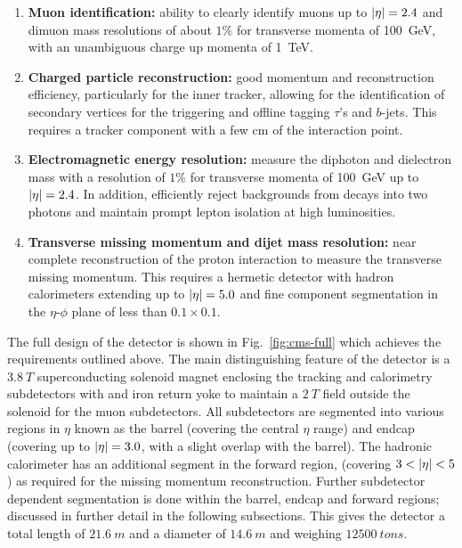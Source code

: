 \begin{enumerate}
    \item \textbf{Muon identification:} ability to clearly identify muons up to
    $|\eta|=2.4$ and dimuon mass resolutions of about $1\%$ for transverse
    momenta of \SI{100}{GeV}, with an unambiguous charge up momenta of
    \SI{1}{TeV}.
    \item \textbf{Charged particle reconstruction:} good momentum and
    reconstruction efficiency, particularly for the inner tracker, allowing
    for the identification of secondary vertices for the triggering and
    offline tagging $\tau$'s and $b$-jets. This requires a tracker component
    with a few cm of the interaction point.
    \item \textbf{Electromagnetic energy resolution:} measure the diphoton and
    dielectron mass with a resolution of $1\%$ for transverse momenta of
    \SI{100}{GeV} up to $|\eta|=2.4$. In addition, efficiently reject backgrounds
    from \Ppizero decays into two photons and maintain prompt lepton isolation
    at high luminosities.
    \item \textbf{Transverse missing momentum and dijet mass resolution:} near
    complete reconstruction of the proton interaction to measure the
    transverse missing momentum. This requires a hermetic detector with hadron
    calorimeters extending up to $|\eta|=5.0$ and fine component segmentation
    in the $\eta$-$\phi$ plane of less than $0.1\times 0.1$.
\end{enumerate}

The full design of the \CMS detector is shown in Fig.~\ref{fig:cms-full} which
achieves the requirements outlined above. The main distinguishing feature of
the \CMS detector is a ${\SI{3.8}{T}}$ superconducting solenoid magnet
enclosing the tracking and calorimetry subdetectors with and iron return yoke
to maintain a ${\SI{2}{T}}$ field outside the solenoid for the muon
subdetectors. All subdetectors are segmented into various regions in $\eta$
known as the barrel (covering the central $\eta$ range) and endcap (covering
up to $|\eta|=3.0$, with a slight overlap with the barrel). The hadronic
calorimeter has an additional segment in the forward region, (covering
$3<\aeta<5$) as required for the missing momentum reconstruction. Further
subdetector dependent segmentation is done within the barrel, endcap and
forward regions; discussed in further detail in the following subsections.
This gives the \CMS detector a total length of ${\SI{21.6}{m}}$ and a diameter
of ${\SI{14.6}{m}}$ and weighing ${\SI{12500}{tons}}$.

